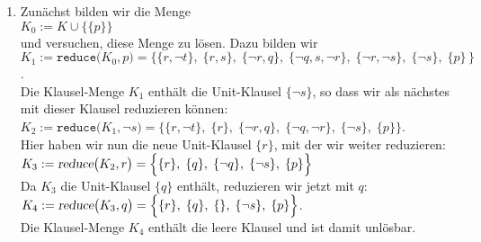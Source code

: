 \begin{enumerate}
\item Zunächst bilden wir die Menge \\[0.2cm]
      \hspace*{1.3cm} $K_0 := K \cup \bigl\{ \{p\} \bigr\}$       \\[0.2cm]
      und versuchen, diese Menge zu lösen.  Dazu bilden wir \\[0.2cm]
      \hspace*{0.3cm} 
      $K_1 := \texttt{reduce}\bigl(K_0,p\bigr) = 
          \Big\{ \{r, \neg t\},\; \{r, s\},\; \{\neg r, q\},\; \{\neg q, s, \neg r\},\; \{\neg r, \neg s\},\; \{ \neg s\},\;\{p\}\, \Big\}$.
      \\[0.2cm]
      Die Klausel-Menge $K_1$ enthält die Unit-Klausel $\{\neg s\}$,
      so dass wir als nächstes mit dieser Klausel reduzieren können: \\[0.2cm]
      \hspace*{1.3cm} 
      $K_2 := \texttt{reduce}\bigl(K_1,\neg s\bigr) = 
              \Big\{ \{r, \neg t\},\; \{r\},\; \{\neg r, q\},\; \{\neg q, \neg r\},\; \{ \neg s\},\; \{p\} \Big\}$.
      \\[0.2cm]
      Hier haben wir nun die neue Unit-Klausel $\{r\}$, mit der wir weiter reduzieren:
      \\[0.2cm]
      \hspace*{1.3cm} 
      $K_3 := \textsl{reduce}\bigl(K_2, r\bigr) = 
              \Big\{ \{r\},\; \{q\},\; \{\neg q\},\; \{ \neg s\},\; \{p\} \Big\}$
      \\[0.2cm]
      Da $K_3$ die Unit-Klausel $\{q\}$ enthält, reduzieren wir jetzt mit $q$: \\[0.2cm]
      \hspace*{1.3cm} 
      $K_4 := \textsl{reduce}\bigl(K_3, q\bigr) = 
              \Big\{ \{r\},\; \{q\},\; \{\},\; \{ \neg s\},\; \{p\} \Big\}$.
      \\[0.2cm]
      Die Klausel-Menge $K_4$ enthält die leere Klausel und ist damit unlösbar.
     

\end{enumerate}
